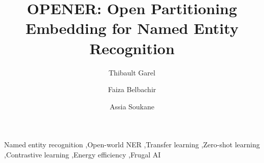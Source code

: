 \documentclass[final,5p,twocolumn]{elsarticle}
\begin{document}
\begin{frontmatter}

\title{OPENER: Open Partitioning Embedding for Named Entity Recognition}

\author[lyrids]{Thibault Garel}
\author[lyrids]{Faiza Belbachir}
\author[lyrids]{Assia Soukane}


\begin{abstract}

\end{abstract}

\begin{keyword}
Named entity recognition \sep Open-world NER \sep Transfer learning \sep Zero-shot learning \sep Contrastive learning \sep Energy efficiency \sep Frugal AI
\end{keyword}

\end{frontmatter}











\end{document}

